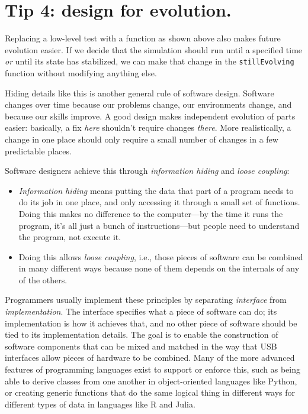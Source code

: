 \documentclass[10pt,letterpaper]{article}
\begin{document}
\section*{Tip 4: design for evolution.}

Replacing a low-level test with a function as shown above also makes future evolution easier.
If we decide that the simulation should run until a specified time
\emph{or} until its state has stabilized,
we can make that change in the \texttt{stillEvolving} function
without modifying anything else.

Hiding details like this is another general rule of software design.
Software changes over time because our problems change,
our environments change,
and because our skills improve.
A good design makes independent evolution of parts easier:
basically,
a fix \emph{here} shouldn't require changes \emph{there}.
More realistically,
a change in one place should only require a small number of changes
in a few predictable places.

Software designers achieve this through \emph{information hiding}
and \emph{loose coupling}:

\begin{itemize}

\item
  \emph{Information hiding} means
  putting the data that part of a program needs to do its job in one place,
  and only accessing it through a small set of functions.
  Doing this makes no difference to the computer---by the time it runs the program,
  it's all just a bunch of instructions---but
  people need to understand the program,
  not execute it.

\item
  Doing this allows \emph{loose coupling},
  i.e.,
  those pieces of software can be combined in many different ways
  because none of them depends on the internals of any of the others.

\end{itemize}

Programmers usually implement these principles
by separating \emph{interface} from \emph{implementation}.
The interface specifies what a piece of software can do;
its implementation is how it achieves that,
and no other piece of software should be tied to its implementation details.
The goal is to enable the construction of software components
that can be mixed and matched in the way that USB interfaces allow pieces of hardware to be combined.
Many of the more advanced features of programming languages exist to support or enforce this,
such as being able to derive classes from one another in object-oriented languages like Python,
or creating generic functions that do the same logical thing in different ways for different types of data in languages like R and Julia.
\end{document}
